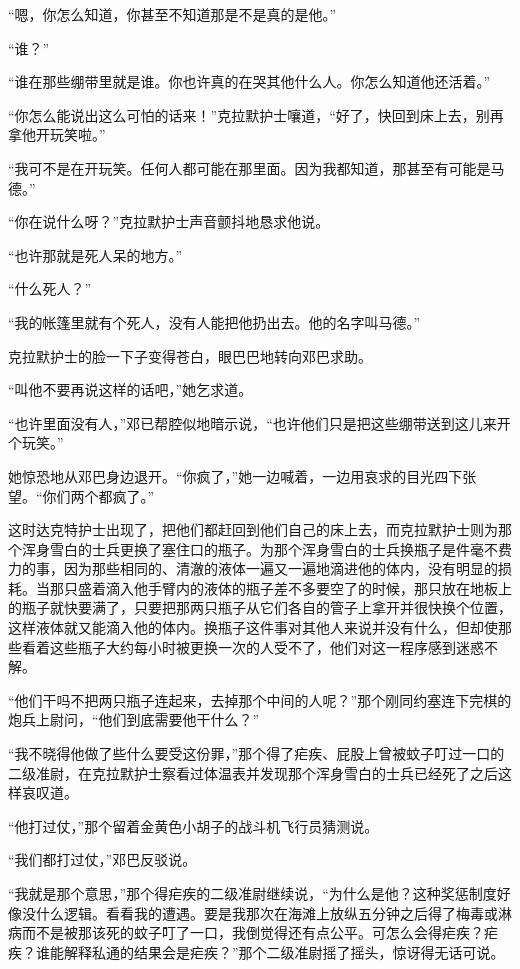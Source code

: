     “嗯，你怎么知道，你甚至不知道那是不是真的是他。”

    “谁？”

    “谁在那些绷带里就是谁。你也许真的在哭其他什么人。你怎么知道他还活着。”

    “你怎么能说出这么可怕的话来！”克拉默护士嚷道，“好了，快回到床上去，别再拿他开玩笑啦。”

    “我可不是在开玩笑。任何人都可能在那里面。因为我都知道，那甚至有可能是马德。”

    “你在说什么呀？”克拉默护士声音颤抖地恳求他说。

    “也许那就是死人呆的地方。”

    “什么死人？”

    “我的帐篷里就有个死人，没有人能把他扔出去。他的名字叫马德。”

    克拉默护士的脸一下子变得苍白，眼巴巴地转向邓巴求助。

    “叫他不要再说这样的话吧，”她乞求道。

    “也许里面没有人，”邓已帮腔似地暗示说，“也许他们只是把这些绷带送到这儿来开个玩笑。”

    她惊恐地从邓巴身边退开。“你疯了，”她一边喊着，一边用哀求的目光四下张望。“你们两个都疯了。”

    这时达克特护士出现了，把他们都赶回到他们自己的床上去，而克拉默护士则为那个浑身雪白的士兵更换了塞住口的瓶子。为那个浑身雪白的士兵换瓶子是件毫不费力的事，因为那些相同的、清澈的液体一遍又一遍地滴进他的体内，没有明显的损耗。当那只盛着滴入他手臂内的液体的瓶子差不多要空了的时候，那只放在地板上的瓶子就快要满了，只要把那两只瓶子从它们各自的管子上拿开并很快换个位置，这样液体就又能滴入他的体内。换瓶子这件事对其他人来说并没有什么，但却使那些看着这些瓶子大约每小时被更换一次的人受不了，他们对这一程序感到迷惑不解。

    “他们干吗不把两只瓶子连起来，去掉那个中间的人呢？”那个刚同约塞连下完棋的炮兵上尉问，“他们到底需要他干什么？”
 


    “我不晓得他做了些什么要受这份罪，”那个得了疟疾、屁股上曾被蚊子叮过一口的二级准尉，在克拉默护士察看过体温表并发现那个浑身雪白的士兵已经死了之后这样哀叹道。

    “他打过仗，”那个留着金黄色小胡子的战斗机飞行员猜测说。

    “我们都打过仗，”邓巴反驳说。

    “我就是那个意思，”那个得疟疾的二级准尉继续说，“为什么是他？这种奖惩制度好像没什么逻辑。看看我的遭遇。要是我那次在海滩上放纵五分钟之后得了梅毒或淋病而不是被那该死的蚊子叮了一口，我倒觉得还有点公平。可怎么会得疟疾？疟疾？谁能解释私通的结果会是疟疾？”那个二级准尉摇了摇头，惊讶得无话可说。

